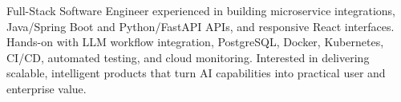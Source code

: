 \par{
Full-Stack Software Engineer experienced in building microservice integrations, Java/Spring Boot and Python/FastAPI APIs, and responsive React interfaces. Hands-on with LLM workflow integration, PostgreSQL, Docker, Kubernetes, CI/CD, automated testing, and cloud monitoring. Interested in delivering scalable, intelligent products that turn AI capabilities into practical user and enterprise value.
}
